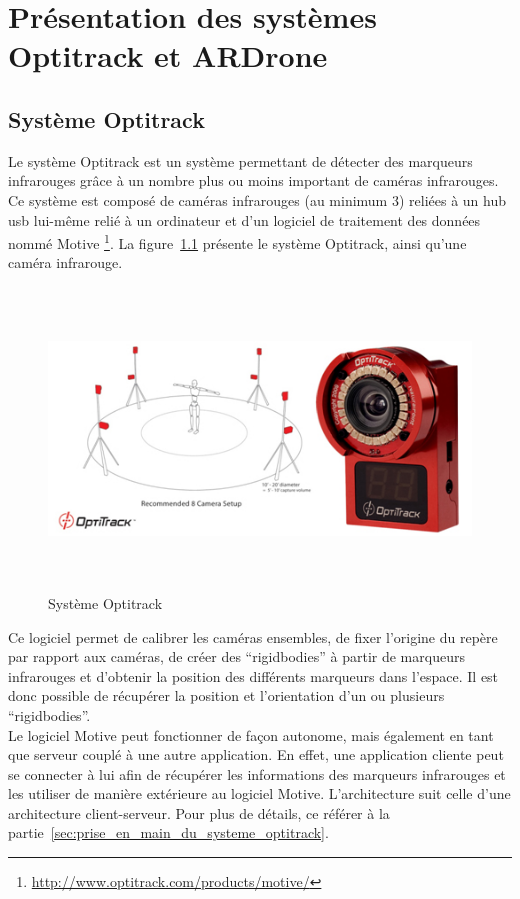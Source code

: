 \chapter{Présentation des systèmes Optitrack et ARDrone}

    \section{Système Optitrack}
        Le système Optitrack est un système permettant de détecter des marqueurs infrarouges grâce à un nombre plus ou moins important de caméras infrarouges. Ce système est composé de caméras infrarouges (au minimum 3) reliées à un hub usb lui-même relié à un ordinateur et d'un logiciel de traitement des données nommé Motive \footnote{\url{http://www.optitrack.com/products/motive/}}. La figure~\ref{fig:systeme_optitrack} présente le système Optitrack, ainsi qu'une caméra infrarouge.

        \begin{figure}[h]
          \centering
          \includegraphics[height=8cm]{images/optitrack_systeme.jpg}
          \caption{Système Optitrack}
          \label{fig:systeme_optitrack}
        \end{figure}

        Ce logiciel permet de calibrer les caméras ensembles, de fixer l'origine du repère par rapport aux caméras, de créer des ``rigidbodies'' à partir de marqueurs infrarouges et d'obtenir la position des différents marqueurs dans l'espace. Il est donc possible de récupérer la position et l'orientation d'un ou plusieurs ``rigidbodies''. \\

        Le logiciel Motive peut fonctionner de façon autonome, mais également en tant que serveur couplé à une autre application. En effet, une application cliente peut se connecter à lui afin de récupérer les informations des marqueurs infrarouges et les utiliser de manière extérieure au logiciel Motive. L'architecture suit celle d'une architecture client-serveur. Pour plus de détails, ce référer à la partie~\ref{sec:prise_en_main_du_systeme_optitrack}.


